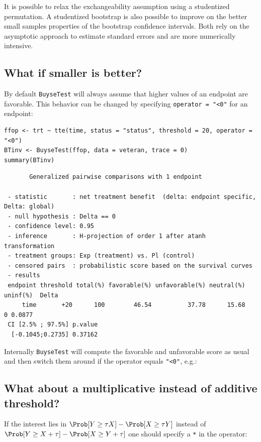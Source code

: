 \documentclass[12pt]{article}
\begin{document}
\bigskip

It is possible to relax the exchangeability assumption using a
studentized permutation. A studentized bootstrap is also possible to
improve on the better small samples properties of the bootstrap
confidence intervals. Both rely on the asymptotic approach to estimate
standard errors and are more numerically intensive.

\clearpage

\subsection{What if smaller is better?}
\label{sec:orgfa79edd}
By default \texttt{BuyseTest} will always assume that higher values of an
endpoint are favorable. This behavior can be changed by specifying \texttt{operator = "<0"}
for an endpoint:
\lstset{language=r,label= ,caption= ,captionpos=b,numbers=none}
\begin{lstlisting}
ffop <- trt ~ tte(time, status = "status", threshold = 20, operator = "<0")
BTinv <- BuyseTest(ffop, data = veteran, trace = 0)
summary(BTinv)
\end{lstlisting}

\begin{verbatim}
       Generalized pairwise comparisons with 1 endpoint

 - statistic       : net treatment benefit  (delta: endpoint specific, Delta: global) 
 - null hypothesis : Delta == 0 
 - confidence level: 0.95 
 - inference       : H-projection of order 1 after atanh transformation 
 - treatment groups: Exp (treatment) vs. Pl (control) 
 - censored pairs  : probabilistic score based on the survival curves
 - results
 endpoint threshold total(%) favorable(%) unfavorable(%) neutral(%) uninf(%)  Delta
     time       +20      100        46.54          37.78      15.68        0 0.0877
 CI [2.5% ; 97.5%] p.value 
  [-0.1045;0.2735] 0.37162
\end{verbatim}

Internally \texttt{BuyseTest} will compute the favorable and unfavorable
score as usual and then switch them around if the operator equals
\texttt{"<0"}, e.g.:

\subsection{What about a multiplicative instead of additive threshold?}
\label{sec:orgd418ae7}

If the interest lies in \(\Prob[Y \geq \tau X ]-\Prob[X \geq \tau Y
]\) instead of \(\Prob[Y \geq X + \tau]-\Prob[X \geq Y + \tau]\) one
should specify a \texttt{*} in the operator:
\end{document}
